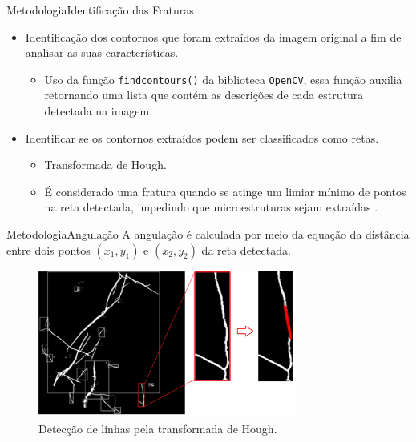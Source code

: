 \documentclass{beamer}
\begin{document}
\begin{frame}{Metodologia}{Identificação das Fraturas}

\begin{itemize}
    \item Identificação dos contornos que foram extraídos da imagem original a fim de analisar as suas características.
    \begin{itemize}
        \item Uso da função \texttt{findcontours()} da biblioteca \texttt{OpenCV}, essa função auxilia retornando uma lista que contém as descrições de cada estrutura detectada na imagem.
    \end{itemize}
    \item Identificar se os contornos extraídos podem ser classificados como retas.
    \begin{itemize}
        \item Transformada de Hough.
        \item É considerado uma fratura quando se atinge um limiar mínimo de pontos na reta detectada, impedindo que microestruturas sejam extraídas .
    \end{itemize}
\end{itemize}
    
\end{frame}

\begin{frame}{Metodologia}{Angulação}
A angulação é calculada por meio da equação da distância entre dois pontos  $(x_1,y_1)$ e $(x_2,y_2)$ da reta detectada.

\begin{figure}[!htb]
    \centering
    \includegraphics[width=8.5cm]{fig/hough_lines.png}\\
    \scriptsize{Detecção de linhas pela transformada de Hough.}
\end{figure}
    
\end{frame}
\end{document}
